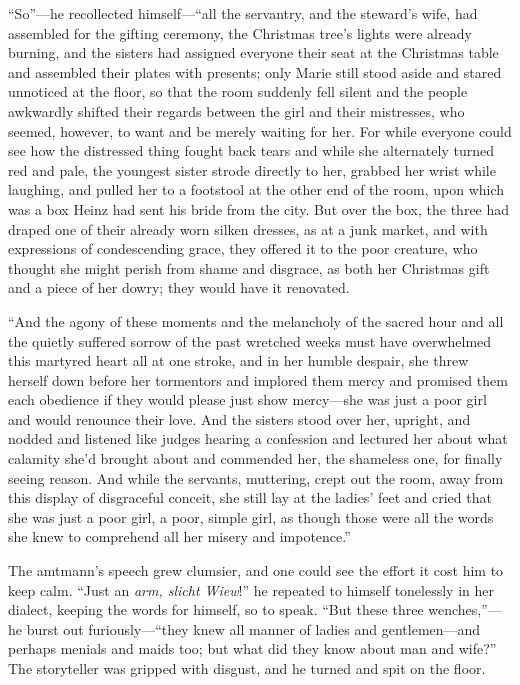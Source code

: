 \documentclass[12pt,a4paper]{article}
\begin{document}
“So”—he recollected himself—“all the servantry, and the steward’s wife, had assembled for the gifting ceremony, the Christmas tree’s lights were already burning, and the sisters had assigned everyone their seat at the Christmas table and assembled their plates with presents; only Marie still stood aside and stared unnoticed at the floor, so that the room suddenly fell silent and the people awkwardly shifted their regards between the girl and their mistresses, who seemed, however, to want and be merely waiting for her. For while everyone could see how the distressed thing fought back tears and while she alternately turned red and pale, the youngest sister strode directly to her, grabbed her wrist while laughing, and pulled her to a footstool at the other end of the room, upon which was a box Heinz had sent his bride from the city. But over the box, the three had draped one of their already worn silken dresses, as at a junk market, and with expressions of condescending grace, they offered it to the poor creature, who thought she might perish from shame and disgrace, as both her Christmas gift and a piece of her dowry; they would have it renovated.

“And the agony of these moments and the melancholy of the sacred hour and all the quietly suffered sorrow of the past wretched weeks must have overwhelmed this martyred heart all at one stroke, and in her humble despair, she threw herself down before her tormentors and implored them mercy and promised them each obedience if they would please just show mercy—she was just a poor girl and would renounce their love. And the sisters stood over her, upright, and nodded and listened like judges hearing a confession and lectured her about what calamity she’d brought about and commended her, the shameless one, for finally seeing reason. And while the servants, muttering, crept out the room, away from this display of disgraceful conceit, she still lay at the ladies’ feet and cried that she was just a poor girl, a poor, simple girl, as though those were all the words she knew to comprehend all her misery and impotence.”

The amtmann’s speech grew clumsier, and one could see the effort it cost him to keep calm. “Just an \textit{arm, slicht Wiew}!” he repeated to himself tonelessly in her dialect, keeping the words for himself, so to speak. “But these three wenches,”—he burst out furiously—“they knew all manner of ladies and gentlemen—and perhaps menials and maids too; but what did they know about man and wife?” The storyteller was gripped with disgust, and he turned and spit on the floor.
\end{document}
